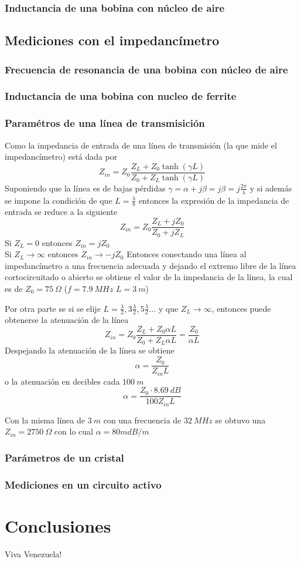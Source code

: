 \documentclass[a4paper,10pt]{article}
\begin{document}
		\subsubsection{Inductancia de una bobina con n\'ucleo de aire}
		
		\subsection{Mediciones con el impedanc\'imetro}
		\subsubsection{Frecuencia de resonancia de una bobina con n\'ucleo de aire}
		\subsubsection{Inductancia de una bobina con nucleo de ferrite}
		\subsubsection{Param\'etros de una l\'inea de transmisici\'on}
		Como la impedancia de entrada de una l\'inea de transmisi\'on (la que mide el impedanc\'imetro) est\'a dada por $$Z_{in}=Z_0\frac{Z_L+Z_0\tanh(\gamma L)}{Z_0+Z_L\tanh(\gamma L)}$$
		Suponiendo que la l\'inea es de bajas p\'erdidas $\gamma=\alpha+j\beta=j\beta=j\frac{2\pi}{\lambda}$ y si adem\'as se impone la condici\'on de que $L=\frac{\lambda}{8}$ entonces la expresi\'on de la impedancia de entrada se reduce a la siguiente
		$$Z_{in}=Z_0\frac{Z_L+jZ_0}{Z_0+jZ_L}$$
		Si $Z_L= 0$ entonces $Z_{in}=jZ_0$ \\
		Si $Z_L \rightarrow \infty$ entonces $Z_{in}\rightarrow-jZ_0$
		Entonces conectando una l\'inea al impedanc\'imetro a una frecuencia adecuada y dejando el extremo libre de la l\'inea cortocircuitado o abierto se obtiene el valor de la impedancia de la l\'inea, la cual es de $Z_0=75~\Omega$ ($f=7.9~MHz$ $L=3~m$)
		
		Por otra parte se si se elije $L=\frac{\lambda}{2},3\frac{\lambda}{2}, 5\frac{\lambda}{2} ...$ y que $Z_L\rightarrow\infty$, entonces puede obtenerse la atenuaci\'on de la l\'inea
		$$Z_{in}=Z_0\frac{Z_L+Z_0\alpha L}{Z_0+Z_L\alpha L}=\frac{Z_0}{\alpha L}$$
		Despejando la atenuaci\'on de la l\'inea se obtiene
		$$\alpha=\frac{Z_0}{Z_{in} L}$$
		o la atenuaci\'on en decibles cada $100~m$
		$$\alpha=\frac{Z_0\cdot8.69~dB}{100Z_{in} L}$$
		
		Con la misma l\'inea de  $3~m$ con una frecuencia de $32~MHz$ se obtuvo una $Z_{in}=2750~\Omega$ con lo cual $\alpha=80 mdB/m$
		\subsubsection{Par\'ametros de un cristal}	
		\subsubsection{Mediciones en un circuito activo}
			
	\section{Conclusiones}
	\indent Viva Venezuela!\\
\end{document}
